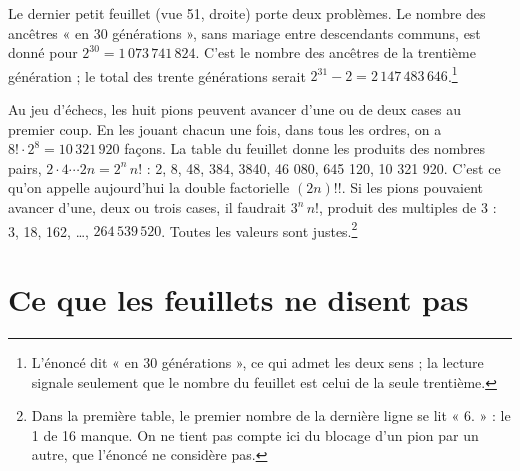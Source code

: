 \documentclass[11pt,a4paper]{article}
\begin{document}
Le dernier petit feuillet (vue 51, droite) porte deux problèmes. Le nombre des
ancêtres « en 30 générations », sans mariage entre descendants communs, est
donné pour \(2^{30}=1\,073\,741\,824\). C'est le nombre des ancêtres de la
trentième génération ; le total des trente générations serait
\(2^{31}-2=2\,147\,483\,646\).\footnote{L'énoncé dit « en 30 générations », ce
qui admet les deux sens ; la lecture signale seulement que le nombre du
feuillet est celui de la seule trentième.}

Au jeu d'échecs, les huit pions peuvent avancer d'une ou de deux cases au
premier coup. En les jouant chacun une fois, dans tous les ordres, on a
\(8!\cdot2^8=10\,321\,920\) façons. La table du feuillet donne les produits
des nombres pairs, \(2\cdot4\cdots2n=2^n\,n!\) : 2, 8, 48, 384, 3840, 46 080,
645 120, 10 321 920. C'est ce qu'on appelle aujourd'hui la double factorielle
\((2n)!!\). Si les pions pouvaient avancer d'une, deux ou trois cases, il
faudrait \(3^n\,n!\), produit des multiples de 3 : 3, 18, 162, \ldots,
\(264\,539\,520\). Toutes les valeurs sont justes.\footnote{Dans la première
table, le premier nombre de la dernière ligne se lit « 6. » : le 1 de 16
manque. On ne tient pas compte ici du blocage d'un pion par un autre, que
l'énoncé ne considère pas.}

\section*{Ce que les feuillets ne disent pas}
\end{document}
